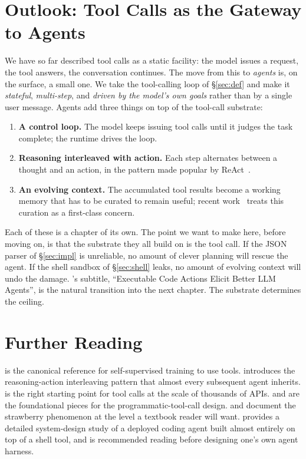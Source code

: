 \section{Outlook: Tool Calls as the Gateway to Agents}
\label{sec:agents}

We have so far described tool calls as a static facility: the model
issues a request, the tool answers, the conversation continues. The
move from this to \emph{agents} is, on the surface, a small one. We
take the tool-calling loop of \S\ref{sec:def} and make it
\emph{stateful}, \emph{multi-step}, and \emph{driven by the model's
own goals} rather than by a single user message. Agents add three
things on top of the tool-call substrate:

\begin{enumerate}[label=(\roman*)]
\item \textbf{A control loop.} The model keeps issuing tool calls
  until it judges the task complete; the runtime drives the loop.
\item \textbf{Reasoning interleaved with action.} Each step
  alternates between a thought and an action, in the pattern made
  popular by ReAct~\citep{yao2023react}.
\item \textbf{An evolving context.} The accumulated tool results
  become a working memory that has to be curated to remain useful;
  recent work~\citep{zhang2025ace} treats this curation as a
  first-class concern.
\end{enumerate}

\noindent
Each of these is a chapter of its own. The point we want to make
here, before moving on, is that the substrate they all build on is
the tool call. If the JSON parser of \S\ref{sec:impl} is unreliable,
no amount of clever planning will rescue the agent. If the shell
sandbox of \S\ref{sec:shell} leaks, no amount of evolving context
will undo the damage.
\citet{wang2024codeact}'s subtitle, ``Executable Code Actions Elicit
Better LLM Agents'', is the natural transition into the next
chapter. The substrate determines the ceiling.

\section*{Further Reading}

\citet{schick2023toolformer} is the canonical reference for
self-supervised training to use tools. \citet{yao2023react}
introduces the reasoning-action interleaving pattern that almost
every subsequent agent inherits. \citet{patil2023gorilla} is the
right starting point for tool calls at the scale of thousands of
APIs. \citet{wang2024codeact} and \citet{anthropic2025mcpcode} are
the foundational pieces for the programmatic-tool-call design.
\citet{fu2024counting} and \citet{xu2024geniusparadox} document the
strawberry phenomenon at the level a textbook reader will want.
\citet{liu2026claudecode} provides a detailed system-design study of
a deployed coding agent built almost entirely on top of a shell
tool, and is recommended reading before designing one's own agent
harness.
